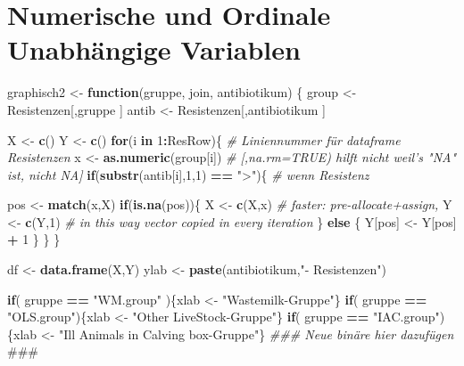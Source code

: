 \documentclass[
]{article}
\newenvironment{Shaded}{\begin{snugshade}}{\end{snugshade}}
\newcommand{\AlertTok}[1]{\textcolor[rgb]{0.94,0.16,0.16}{#1}}
\newcommand{\CommentTok}[1]{\textcolor[rgb]{0.56,0.35,0.01}{\textit{#1}}}
\newcommand{\ControlFlowTok}[1]{\textcolor[rgb]{0.13,0.29,0.53}{\textbf{#1}}}
\newcommand{\DecValTok}[1]{\textcolor[rgb]{0.00,0.00,0.81}{#1}}
\newcommand{\KeywordTok}[1]{\textcolor[rgb]{0.13,0.29,0.53}{\textbf{#1}}}
\newcommand{\NormalTok}[1]{#1}
\newcommand{\OperatorTok}[1]{\textcolor[rgb]{0.81,0.36,0.00}{\textbf{#1}}}
\newcommand{\StringTok}[1]{\textcolor[rgb]{0.31,0.60,0.02}{#1}}
\begin{document}
\hypertarget{numerische-und-ordinale-unabhuxe4ngige-variablen}{%
\section{Numerische und Ordinale Unabhängige
Variablen}\label{numerische-und-ordinale-unabhuxe4ngige-variablen}}

\begin{Shaded}
\begin{Highlighting}[]
\NormalTok{graphisch2 <-}\StringTok{ }\ControlFlowTok{function}\NormalTok{(gruppe, join, antibiotikum) \{}
\NormalTok{  group <-}\StringTok{ }\NormalTok{Resistenzen[,gruppe ] }
\NormalTok{  antib      <-}\StringTok{ }\NormalTok{Resistenzen[,antibiotikum ]}

\NormalTok{  X <-}\StringTok{ }\KeywordTok{c}\NormalTok{()}
\NormalTok{  Y <-}\StringTok{ }\KeywordTok{c}\NormalTok{()}
  \ControlFlowTok{for}\NormalTok{(i }\ControlFlowTok{in} \DecValTok{1}\OperatorTok{:}\NormalTok{ResRow)\{                      }\CommentTok{# Liniennummer für dataframe Resistenzen}
\NormalTok{    x <-}\StringTok{ }\KeywordTok{as.numeric}\NormalTok{(group[i])              }\CommentTok{# [,na.rm=TRUE) hilft nicht weil's "NA" ist, nicht NA]}
    \ControlFlowTok{if}\NormalTok{(}\KeywordTok{substr}\NormalTok{(antib[i],}\DecValTok{1}\NormalTok{,}\DecValTok{1}\NormalTok{) }\OperatorTok{==}\StringTok{ ">"}\NormalTok{)\{       }\CommentTok{# wenn Resistenz}
      
\NormalTok{      pos <-}\StringTok{ }\KeywordTok{match}\NormalTok{(x,X)                   }
      \ControlFlowTok{if}\NormalTok{(}\KeywordTok{is.na}\NormalTok{(pos))\{}
\NormalTok{        X <-}\StringTok{ }\KeywordTok{c}\NormalTok{(X,x)    }\CommentTok{# faster: pre-allocate+assign,}
\NormalTok{        Y <-}\StringTok{ }\KeywordTok{c}\NormalTok{(Y,}\DecValTok{1}\NormalTok{)    }\CommentTok{# in this way vector copied in every iteration}
\NormalTok{      \} }\ControlFlowTok{else}\NormalTok{ \{}
\NormalTok{        Y[pos] <-}\StringTok{ }\NormalTok{Y[pos] }\OperatorTok{+}\StringTok{ }\DecValTok{1}
\NormalTok{      \}}
\NormalTok{    \}}
\NormalTok{  \}  }

\NormalTok{  df <-}\StringTok{ }\KeywordTok{data.frame}\NormalTok{(X,Y)}
\NormalTok{  ylab <-}\StringTok{ }\KeywordTok{paste}\NormalTok{(antibiotikum,}\StringTok{"- Resistenzen"}\NormalTok{)}
  
  \ControlFlowTok{if}\NormalTok{( gruppe }\OperatorTok{==}\StringTok{ "WM.group"}\NormalTok{ )\{xlab <-}\StringTok{ "Wastemilk-Gruppe"}\NormalTok{\}}
  \ControlFlowTok{if}\NormalTok{( gruppe }\OperatorTok{==}\StringTok{ "OLS.group"}\NormalTok{)\{xlab <-}\StringTok{ "Other LiveStock-Gruppe"}\NormalTok{\}            }
  \ControlFlowTok{if}\NormalTok{( gruppe }\OperatorTok{==}\StringTok{ "IAC.group"}\NormalTok{)\{xlab <-}\StringTok{ "Ill Animals in Calving box-Gruppe"}\NormalTok{\}}
  \CommentTok{### Neue binäre hier dazufügen }\AlertTok{###}


\end{Highlighting}
\end{Shaded}
\end{document}
